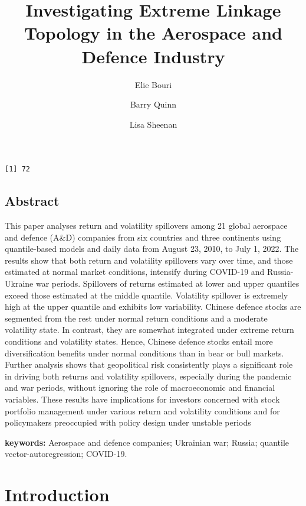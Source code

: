 \documentclass[
  letterpaper,
  DIV=11,
  numbers=noendperiod]{scrartcl}
\title{Investigating Extreme Linkage Topology in the Aerospace and
Defence Industry}
\author{Elie Bouri \and Barry Quinn \and Lisa Sheenan}
\date{}
\begin{document}
\maketitle
\ifdefined\Shaded\renewenvironment{Shaded}{\begin{tcolorbox}[frame hidden, breakable, interior hidden, boxrule=0pt, sharp corners, borderline west={3pt}{0pt}{shadecolor}, enhanced]}{\end{tcolorbox}}\fi

\begin{verbatim}
[1] 72
\end{verbatim}

\hypertarget{abstract}{%
\subsection*{Abstract}\label{abstract}}

This paper analyses return and volatility spillovers among 21 global
aerospace and defence (A\&D) companies from six countries and three
continents using quantile-based models and daily data from August 23,
2010, to July 1, 2022. The results show that both return and volatility
spillovers vary over time, and those estimated at normal market
conditions, intensify during COVID-19 and Russia-Ukraine war periods.
Spillovers of returns estimated at lower and upper quantiles exceed
those estimated at the middle quantile. Volatility spillover is
extremely high at the upper quantile and exhibits low variability.
Chinese defence stocks are segmented from the rest under normal return
conditions and a moderate volatility state. In contrast, they are
somewhat integrated under extreme return conditions and volatility
states. Hence, Chinese defence stocks entail more diversification
benefits under normal conditions than in bear or bull markets. Further
analysis shows that geopolitical risk consistently plays a significant
role in driving both returns and volatility spillovers, especially
during the pandemic and war periods, without ignoring the role of
macroeconomic and financial variables. These results have implications
for investors concerned with stock portfolio management under various
return and volatility conditions and for policymakers preoccupied with
policy design under unstable periods

\textbf{keywords:} Aerospace and defence companies; Ukrainian war;
Russia; quantile vector-autoregression; COVID-19.

\hypertarget{introduction}{%
\section{Introduction}\label{introduction}}
\end{document}
